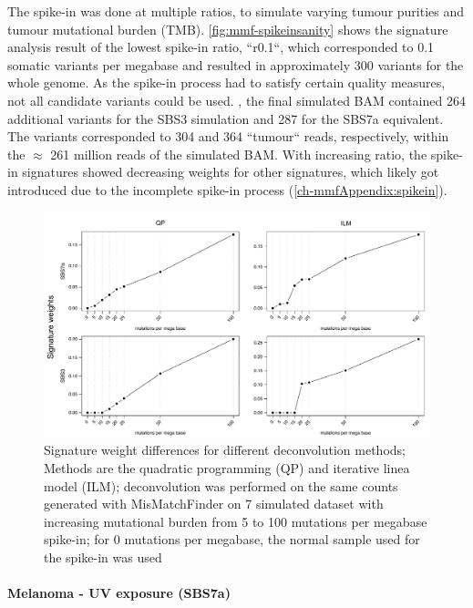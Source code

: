 The spike-in was done at multiple  ratios, to simulate varying tumour purities and tumour mutational burden (TMB). \autoref{fig:mmf-spikeinsanity} shows the signature analysis result of the lowest spike-in ratio, ``r0.1``, which corresponded to 0.1 somatic variants per megabase and resulted in approximately 300 variants for the whole genome. As the spike-in process had to satisfy certain quality measures, not all candidate variants could be used. , the final simulated BAM contained 264 additional  variants for the SBS3 simulation and 287 for the SBS7a equivalent. The variants corresponded to 304 and 364 ``tumour`` reads, respectively, within the $\approx$ 261 million reads of the simulated BAM. With increasing ratio, the spike-in signatures showed decreasing weights for other signatures, which likely got introduced due to the incomplete spike-in process (\autoref{ch-mmfAppendix:spikein}).


\begin{figure}[ht]
\centering
\includegraphics[width=.99\linewidth]{Figures/MisMatchFinder/deconstructionMethodsDifferences.pdf}
\caption[Signature weight differences for different deconvolution methods]{Signature weight differences for different deconvolution methods; Methods are the quadratic programming (QP) and iterative linea model (ILM); deconvolution was performed on the same counts generated with MisMatchFinder on 7 simulated dataset with increasing mutational burden from 5 to 100 mutations per megabase spike-in; for 0 mutations per megabase, the normal sample used for the spike-in was used}\label{fig:mmf-methodDifferences}
\end{figure}


\paragraph{Melanoma - UV exposure (SBS7a)}
\label{mmf-sec:melaSim}


